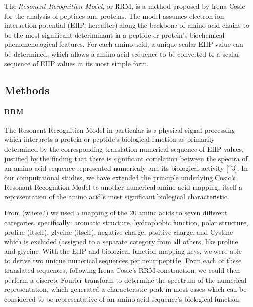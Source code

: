 \documentclass[]{article}
\let\oldparagraph\paragraph
\renewcommand{\paragraph}[1]{\oldparagraph{#1}\mbox{}}
\begin{document}
	The \emph{Resonant Recognition Model}, or RRM, is a method proposed by
	Irena Cosic for the analysis of peptides and proteins. The model assumes
	electron-ion interaction potential (EIIP, hereafter) along the backbone
	of amino acid chains to be the most significant deteriminant in a
	peptide or protein's biochemical phenomenological features. For each
	amino acid, a unique scalar EIIP value can be determined, which allows a
	amino acid sequence to be converted to a scalar sequence of EIIP values
	in its most simple form.
	
	\hypertarget{methods}{%
		\subsection{Methods}\label{methods}}
	
	\hypertarget{rrm}{%
		\paragraph{RRM}\label{rrm}}
	
	The Resonant Recognition Model in particular is a physical signal
	processing which interprets a protein or peptide's biological function
	as primarily determined by the corresponding translation numerical
	sequence of EIIP values, justified by the finding that there is
	significant correlation between the spectra of an amino acid sequence
	represented numericaly and its biological activity {[}\^{}3{]}. In our
	computational studies, we have extended the principle underlying Cosic's
	Resonant Recognition Model to another numerical amino acid mapping,
	itself a representation of the amino acid's most significant biological
	characteristic.
	
	From (where?) we used a mapping of the 20 amino acids to seven different
	categories, specifically: aromatic structure, hydrophobic function,
	polar structure, proline (itself), glycine (itself), negative charge,
	positive charge, and Cystine which is excluded (assigned to a separate
	category from all others, like proline and glycine. With the EIIP and
	biological function mapping keys, we were able to derive two unique
	numerical sequences per neuropeptide. From each of these translated
	sequences, following Irena Cosic's RRM construction, we could then
	perform a discrete Fourier transform to determine the spectrum of the
	numerical representation, which generated a characteristic peak in most
	cases which can be considered to be representative of an amino acid
	sequence's biological function.
	
\end{document}
